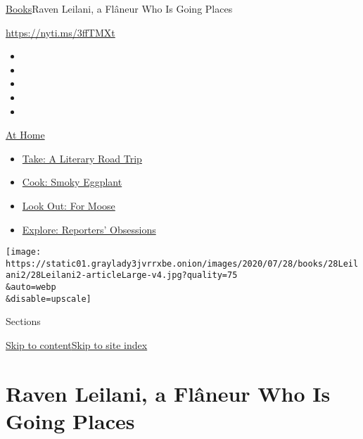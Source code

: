 \href{/section/books}{Books}\textbar{}Raven Leilani, a Flâneur Who Is
Going Places

\url{https://nyti.ms/3ffTMXt}

\begin{itemize}
\item
\item
\item
\item
\item
\end{itemize}

\href{https://www.nytimes3xbfgragh.onion/spotlight/at-home?action=click\&pgtype=Article\&state=default\&region=TOP_BANNER\&context=at_home_menu}{At
Home}

\begin{itemize}
\tightlist
\item
  \href{https://www.nytimes3xbfgragh.onion/2020/07/28/books/time-for-a-literary-road-trip.html?action=click\&pgtype=Article\&state=default\&region=TOP_BANNER\&context=at_home_menu}{Take:
  A Literary Road Trip}
\item
  \href{https://www.nytimes3xbfgragh.onion/2020/07/29/magazine/bored-with-your-home-cooking-some-smoky-eggplant-will-fix-that.html?action=click\&pgtype=Article\&state=default\&region=TOP_BANNER\&context=at_home_menu}{Cook:
  Smoky Eggplant}
\item
  \href{https://www.nytimes3xbfgragh.onion/2020/07/27/travel/moose-michigan-isle-royale.html?action=click\&pgtype=Article\&state=default\&region=TOP_BANNER\&context=at_home_menu}{Look
  Out: For Moose}
\item
  \href{https://www.nytimes3xbfgragh.onion/interactive/2020/at-home/even-more-reporters-editors-diaries-lists-recommendations.html?action=click\&pgtype=Article\&state=default\&region=TOP_BANNER\&context=at_home_menu}{Explore:
  Reporters' Obsessions}
\end{itemize}

\texttt{[image: https://static01.graylady3jvrrxbe.onion/images/2020/07/28/books/28Leilani2/28Leilani2-articleLarge-v4.jpg?quality=75\\\&auto=webp\\\&disable=upscale]}

Sections

\protect\hyperlink{site-content}{Skip to
content}\protect\hyperlink{site-index}{Skip to site index}

\hypertarget{raven-leilani-a-fluxe2neur-who-is-going-places}{%
\section{Raven Leilani, a Flâneur Who Is Going
Places}\label{raven-leilani-a-fluxe2neur-who-is-going-places}}

